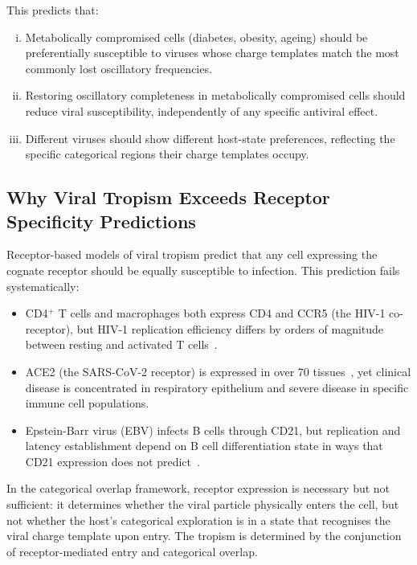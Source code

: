 This predicts that:
\begin{enumerate}[(i)]
  \item Metabolically compromised cells (diabetes, obesity, ageing) should be preferentially susceptible to viruses whose charge templates match the most commonly lost oscillatory frequencies.
  \item Restoring oscillatory completeness in metabolically compromised cells should reduce viral susceptibility, independently of any specific antiviral effect.
  \item Different viruses should show different host-state preferences, reflecting the specific categorical regions their charge templates occupy.
\end{enumerate}

\subsection{Why Viral Tropism Exceeds Receptor Specificity Predictions}

Receptor-based models of viral tropism predict that any cell expressing the cognate receptor should be equally susceptible to infection. This prediction fails systematically:

\begin{itemize}
  \item CD4$^+$ T cells and macrophages both express CD4 and CCR5 (the HIV-1 co-receptor), but HIV-1 replication efficiency differs by orders of magnitude between resting and activated T cells~\cite{Bukrinsky1991,Zack1990}.
  \item ACE2 (the SARS-CoV-2 receptor) is expressed in over 70 tissues~\cite{Zou2020}, yet clinical disease is concentrated in respiratory epithelium and severe disease in specific immune cell populations.
  \item Epstein-Barr virus (EBV) infects B cells through CD21, but replication and latency establishment depend on B cell differentiation state in ways that CD21 expression does not predict~\cite{Young1994}.
\end{itemize}

In the categorical overlap framework, receptor expression is necessary but not sufficient: it determines whether the viral particle physically enters the cell, but not whether the host's categorical exploration is in a state that recognises the viral charge template upon entry. The tropism is determined by the conjunction of receptor-mediated entry and categorical overlap.

